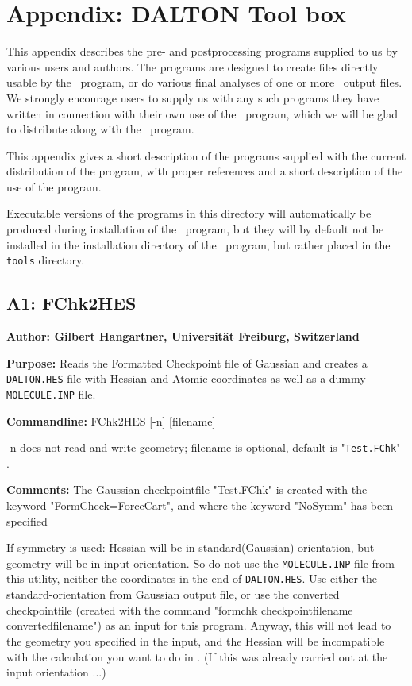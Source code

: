 \section*{Appendix: DALTON Tool box}

This appendix describes the pre- and postprocessing programs
supplied to us by various users and authors. The programs are designed
to create files directly usable by the \dalton\ program, or do
various final analyses of one or more \dalton\ output files. We
strongly encourage users to supply us with any such programs they have
written in connection with their own use of the \dalton\ program,
which we will be glad to distribute along with the \dalton\
program.

This appendix gives a short description of the programs supplied with
the current distribution of the program, with proper references and a
short description of the use of the program.

Executable versions of the programs in this directory will
automatically be produced during installation of the \dalton\ program,
but they will by default not be installed in the installation
directory of the \dalton\ program, but rather placed in the
\verb|tools| directory.

\subsection*{A1: FChk2HES}

\noindent
{\large\bf Author: \normalsize\large Gilbert Hangartner,
Universit\"{a}t Freiburg, Switzerland}

\smallskip

\noindent 
{\bf Purpose:} Reads the Formatted Checkpoint file of Gaussian  
     and creates a \verb|DALTON.HES| file with Hessian and Atomic coordinates
     as well as a dummy \verb|MOLECULE.INP| file.

\smallskip
\noindent
{\bf Commandline:} FChk2HES [-n] [filename]

-n does not read and write geometry; filename is optional, default is
"\verb|Test.FChk|" .

\smallskip
\noindent
{\bf Comments:}     The Gaussian checkpointfile "Test.FChk" is created
     with the keyword "FormCheck=ForceCart", and where the keyword "NoSymm"
     has  been specified

If symmetry is used: Hessian will be in standard(Gaussian) orientation,
        but geometry will be in input orientation. So do not use the
        \verb|MOLECULE.INP| file from this utility, 
        neither the coordinates in the end of \verb|DALTON.HES|.
        Use either the standard-orientation from Gaussian output file, or
        use the converted checkpointfile (created with the command
        "formchk checkpointfilename convertedfilename") as an input for
        this program. Anyway, this will not lead to the geometry you 
        specified in the input, and the Hessian will be incompatible with the
        calculation you want to do in \dalton. (If this was already carried
        out at the input orientation ...)

